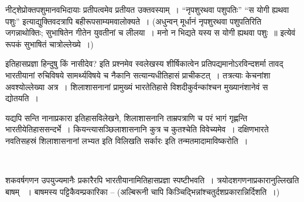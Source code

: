 \vskip 3pt

नीट्शेप्रोक्तपशुमानवभिदायाः प्रतीपत्वमेव प्रतीयत उक्तवस्याम्~। “नृपशुरथवा पशुपतिः” “स योगी ह्यथवा पशुः” इत्याद्युक्तिवदत्रापि बहीरूपसाम्यमवालोक्यते~। (अधुन्वन् मूर्धानं नृपशुरथवा पशुपतिरिति जगन्नाथोक्तिः; सुभाषितेन गीतेन युवतीनां च लीलया~। मनो न भिद्यते यस्य स योगी ह्यथवा पशुः~॥ इत्येवं रूपकं सुभाषितं चात्रोल्लेख्ये~।)

\vskip 3pt

इतिहासप्रज्ञा हिन्दुषु किं नासीदेव? इति प्रश्नमेव स्वलेखस्य शीर्षिकात्वेन प्रतिपद्यमानोऽरविन्दशर्मा  तावद् भारतीयानां रुचिविषये सामर्थ्यविषये च नैकानि सत्यान्यधीतिहासं प्राचीकटत्~। तत्रत्याः केचनांशा अवश्योल्लेख्या अत्र~। शिलाशासनानां प्रामुख्यं भारतेतिहासे विशदीकुर्वन्कांश्चन मुख्यानंशानेवं स द्योतयति~।

\vskip 3pt

यद्यपि सन्ति नानाप्रकारा इतिहासविलेखने, शिलाशासनानि ताम्रपत्राणि च परं भागं गृह्णन्ति भारतीयेतिहाससन्दर्भे~। कियन्त्यासञ्छिलाशासनानि कुत्र च कुतश्चेति विवेच्यमेव~। दक्षिणभारते नवतिसहस्रं शिलाशासनानां लभ्यत इति विलिखति सर्कारः  इति तन्मतमादामाविष्करोति~।

\vskip 3pt

\begin{myquote}

~\hfill {}
\end{myquote}

\vskip 3pt

शकवर्षगणन उपयुज्यमानैः प्रकारैरपि भारतीयानामितिहासप्रज्ञा स्पष्टीभवति~। त्रयोदशगणनाप्रकारानुल्लिखति बाषम् ~। बाषमस्य पट्टिकैवम्प्रकारिका – (अल्बिरूनी चापि किञ्चिद्भिन्नांश्चतुर्दशप्रकारान्निर्दिशति~।)


\vskip 3pt

